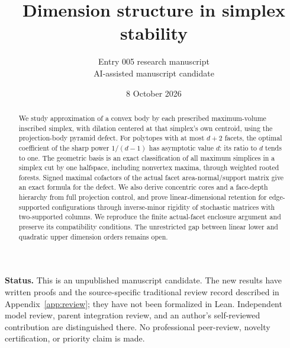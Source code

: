 \documentclass[11pt]{article}
\title{Dimension structure in simplex stability}
\author{Entry 005 research manuscript\\\small AI-assisted manuscript candidate}
\date{8 October 2026}
\numberwithin{equation}{section}
\theoremstyle{definition}\newtheorem{definition}[theorem]{Definition}
\theoremstyle{remark}\newtheorem{remark}[theorem]{Remark}
\begin{document}
\maketitle
\begin{abstract}
We study approximation of a convex body by each prescribed maximum-volume
inscribed simplex, with dilation centered at that simplex's own centroid,
using the projection-body pyramid defect. For polytopes with at most
$d+2$ facets, the optimal coefficient of the sharp power $1/(d-1)$ has
asymptotic value $d$: its ratio to $d$ tends to one. The geometric basis is
an exact classification of all maximum simplices in a simplex cut by one
halfspace, including nonvertex maxima, through weighted rooted forests.
Signed maximal cofactors of the actual facet area-normal/support matrix
give an exact formula for the defect. We also derive concentric cores and
a face-depth hierarchy from full projection control, and prove
linear-dimensional retention for edge-supported configurations through
inverse-minor rigidity of stochastic matrices with two-supported columns.
We reproduce the finite actual-facet enclosure argument and preserve its
compatibility conditions. The unrestricted gap between linear lower and
quadratic upper dimension orders remains open.
\end{abstract}
\noindent\textbf{Status.} This is an unpublished manuscript candidate.
The new results have written proofs and the source-specific traditional
review record described in Appendix~\ref{app:review}; they have not been
formalized in Lean. Independent model review, parent integration review,
and an author's self-reviewed contribution are distinguished there.
No professional peer-review, novelty certification, or priority claim is made.
\setcounter{tocdepth}{1}
\tableofcontents






\appendix




\end{document}
